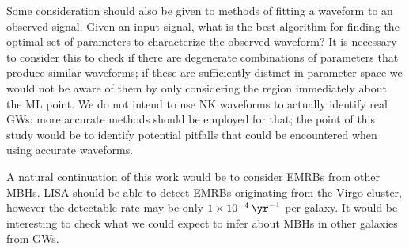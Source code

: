 Some consideration should also be given to methods of fitting a waveform to an observed signal. Given an input signal, what is the best algorithm for finding the optimal set of parameters to characterize the observed waveform? It is necessary to consider this to check if there are degenerate combinations of parameters that produce similar waveforms; if these are sufficiently distinct in parameter space we would not be aware of them by only considering the region immediately about the ML point. We do not intend to use NK waveforms to actually identify real GWs: more accurate methods should be employed for that; the point of this study would be to identify potential pitfalls that could be encountered when using accurate waveforms.

A natural continuation of this work would be to consider EMRBs from other MBHs. LISA should be able to detect EMRBs originating from the Virgo cluster\cite{Rubbo2006}, however the detectable rate may be only $\SI{1e-4}{\yr^{-1}}$ per galaxy\cite{Hopman2007}. It would be interesting to check what we could expect to infer about MBHs in other galaxies from GWs.
